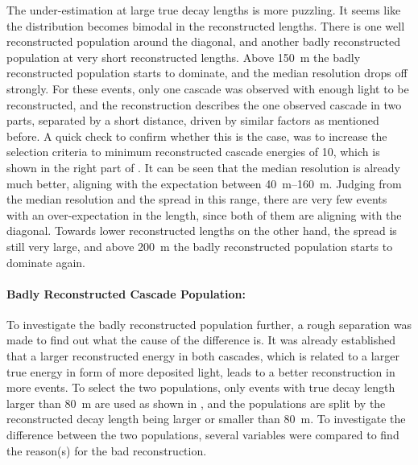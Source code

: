 The under-estimation at large true decay lengths is more puzzling. It seems like the distribution becomes bimodal in the reconstructed lengths. There is one well reconstructed population around the diagonal, and another badly reconstructed population at very short reconstructed lengths. Above \SI{150}{\meter} the badly reconstructed population starts to dominate, and the median resolution drops off strongly. For these events, only one cascade was observed with enough light to be reconstructed, and the reconstruction describes the one observed cascade in two parts, separated by a short distance, driven by similar factors as mentioned before. A quick check to confirm whether this is the case, was to increase the selection criteria to minimum reconstructed cascade energies of \SI{10}{\gev}, which is shown in the right part of . It can be seen that the median resolution is already much better, aligning with the expectation between \SIrange[range-phrase=~and~]{40}{160}{\meter}. Judging from the median resolution and the spread in this range, there are very few events with an over-expectation in the length, since both of them are aligning with the diagonal. Towards lower reconstructed lengths on the other hand, the spread is still very large, and above \SI{200}{\meter} the badly reconstructed population starts to dominate again.


\paragraph{Badly Reconstructed Cascade Population:}


To investigate the badly reconstructed population further, a rough separation was made to find out what the cause of the difference is. It was already established that a larger reconstructed energy in both cascades, which is related to a larger true energy in form of more deposited light, leads to a better reconstruction in more events. To select the two populations, only events with true decay length larger than \SI{80}{\meter} are used as shown in , and the populations are split by the reconstructed decay length being larger or smaller than \SI{80}{\meter}. To investigate the difference between the two populations, several variables were compared to find the reason(s) for the bad reconstruction. 

